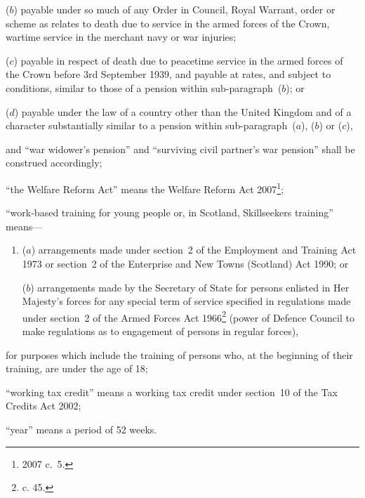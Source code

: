 \documentclass[12pt,a4paper]{article}
\begin{document}
\begin{enumerate}
\begin{enumerate}
($b$) 
payable under so much of any Order in Council, Royal Warrant, order or scheme as relates to death due to service in the armed forces of the Crown, wartime service in the merchant navy or war injuries;

($c$) 
payable in respect of death due to peacetime service in the armed forces of the Crown before 3rd September 1939, and payable at rates, and subject to conditions, similar to those of a pension within sub-paragraph~($b$); or

($d$) 
payable under the law of a country other than the United Kingdom and of a character substantially similar to a pension within sub-paragraph~($a$), ($b$)  or ($c$),
\end{enumerate}
and “war widower’s pension”
and “surviving civil partner’s war pension”  %
shall be construed accordingly;

“the Welfare Reform Act” means the Welfare Reform Act 2007\footnote{2007 c.~5.};

“work-based training for young people or, in Scotland, Skillseekers training” means—
\begin{enumerate}\item[]
($a$) 
arrangements made under section~2 of the Employment and Training Act 1973 or section~2 of the Enterprise and New Towns (Scotland) Act 1990; or

($b$) 
arrangements made by the Secretary of State for persons enlisted in Her Majesty’s forces for any special term of service specified in regulations made under section~2 of the Armed Forces Act 1966\footnote{ c. 45.} (power of Defence Council to make regulations as to engagement of persons in regular forces),
\end{enumerate}
for purposes which include the training of persons who, at the beginning of their training, are under the age of 18;


“working tax credit” means a working tax credit under section~10 of the Tax Credits Act 2002;

“year” means a period of 52 weeks.
\end{enumerate}
\end{document}
